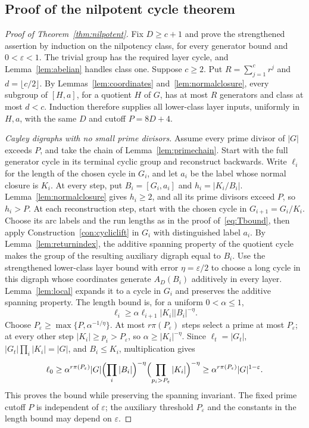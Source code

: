 \documentclass[11pt,a4paper,reqno]{amsart}
\theoremstyle{definition}
\theoremstyle{remark}
\numberwithin{equation}{section}
\newcommand{\eps}{\varepsilon}
\begin{document}
\subsection{Proof of the nilpotent cycle theorem}
\begin{proof}[Proof of Theorem~\ref{thm:nilpotent}]
Fix $D\ge c+1$ and prove the strengthened assertion by induction on the nilpotency class, for every generator bound and $0<\eps<1$. The trivial group has the required layer cycle, and Lemma~\ref{lem:abelian} handles class one. Suppose $c\ge2$. Put $R=\sum_{j=1}^c r^j$ and $d=\lfloor c/2\rfloor$. By Lemmas~\ref{lem:coordinates} and~\ref{lem:normalclosure}, every subgroup of $[H,a]$, for a quotient $H$ of $G$, has at most $R$ generators and class at most $d<c$. Induction therefore supplies all lower-class layer inputs, uniformly in $H,a$, with the same $D$ and cutoff $P=8D+4$.

\emph{Cayley digraphs with no small prime divisors.}
Assume every prime divisor of $|G|$ exceeds $P$, and take the chain of Lemma~\ref{lem:primechain}. Start with the full generator cycle in its terminal cyclic group and reconstruct backwards. Write $\ell_i$ for the length of the chosen cycle in $G_i$, and let $a_i$ be the label whose normal closure is $K_i$. At every step, put $B_i=[G_i,a_i]$ and $h_i=|K_i/B_i|$. Lemma~\ref{lem:normalclosure} gives $h_i\ge2$, and all its prime divisors exceed $P$, so $h_i>P$. At each reconstruction step, start with the chosen cycle in $G_{i+1}=G_i/K_i$. Choose its arc labels and the run lengths as in the proof of~\eqref{eq:Tbound}, then apply Construction~\ref{con:cycliclift} in $G_i$ with distinguished label $a_i$. By Lemma~\ref{lem:returnindex}, the additive spanning property of the quotient cycle makes the group of the resulting auxiliary digraph equal to $B_i$. Use the strengthened lower-class layer bound with error $\eta=\eps/2$ to choose a long cycle in this digraph whose coordinates generate $A_D(B_i)$ additively in every layer. Lemma~\ref{lem:local} expands it to a cycle in $G_i$ and preserves the additive spanning property. The length bound is, for a uniform $0<\alpha\le1$,
\[
 \ell_i\ge\alpha\ell_{i+1}|K_i||B_i|^{-\eta}.
\]
Choose $P_\eps\ge\max\{P,\alpha^{-1/\eta}\}$. At most $r\pi(P_\eps)$ steps select a prime at most $P_\eps$; at every other step $|K_i|\ge p_i>P_\eps$, so $\alpha\ge|K_i|^{-\eta}$. Since $\ell_t=|G_t|$, $|G_t|\prod_i|K_i|=|G|$, and $B_i\le K_i$, multiplication gives
\[
 \ell_0\ge\alpha^{r\pi(P_\eps)}|G|
       \Bigl(\prod_i|B_i|\Bigr)^{-\eta}
       \Bigl(\prod_{p_i>P_\eps}|K_i|\Bigr)^{-\eta}
 \ge\alpha^{r\pi(P_\eps)}|G|^{1-\eps}.
\]
This proves the bound while preserving the spanning invariant. The fixed prime cutoff $P$ is independent of $\eps$; the auxiliary threshold $P_\eps$ and the constants in the length bound may depend on $\eps$.


\end{proof}
\end{document}
